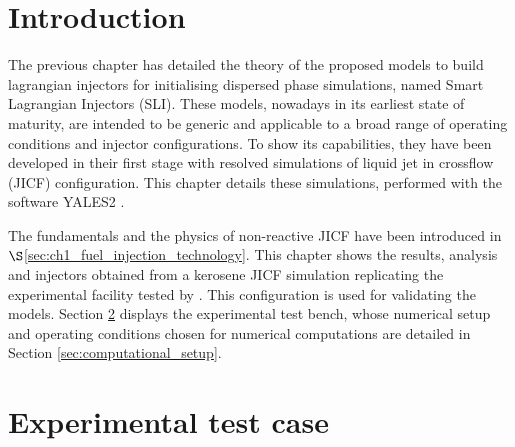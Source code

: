 \newpage 

\section{Introduction}

The previous chapter has detailed the theory of the proposed models to build lagrangian injectors for initialising dispersed phase simulations, named Smart Lagrangian Injectors (SLI). These models, nowadays in its earliest state of maturity, are intended to be generic and applicable to a broad range of operating conditions and injector configurations. To show its capabilities, they have been developed in their first stage with resolved simulations of liquid jet in crossflow (JICF) configuration. This chapter details these simulations, performed with the software YALES2 . %

The fundamentals and the physics of non-reactive JICF have been introduced in $\S$\ref{sec:ch1_fuel_injection_technology}. This chapter shows the results, analysis and injectors obtained from a kerosene JICF simulation replicating the experimental facility tested by . This configuration is used for validating the models. Section \ref{sec:ch5_experimental_bench} displays the experimental test bench, whose numerical setup and operating conditions chosen for numerical computations are detailed in Section \ref{sec:computational_setup}.


\section{Experimental test case}
	\label{sec:ch5_experimental_bench}

